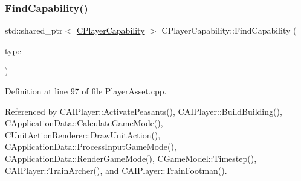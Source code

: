 \subsubsection{\texorpdfstring{Find\+Capability()}{FindCapability()}\hspace{0.1cm}{\footnotesize\ttfamily [1/2]}}
{\footnotesize\ttfamily std\+::shared\+\_\+ptr$<$ \hyperlink{classCPlayerCapability}{C\+Player\+Capability} $>$ C\+Player\+Capability\+::\+Find\+Capability (\begin{DoxyParamCaption}\item[{\hyperlink{GameDataTypes_8h_a35b98ce26aca678b03c6f9f76e4778ce}{E\+Asset\+Capability\+Type}}]{type }\end{DoxyParamCaption})\hspace{0.3cm}{\ttfamily [static]}}



Definition at line 97 of file Player\+Asset.\+cpp.



Referenced by C\+A\+I\+Player\+::\+Activate\+Peasants(), C\+A\+I\+Player\+::\+Build\+Building(), C\+Application\+Data\+::\+Calculate\+Game\+Mode(), C\+Unit\+Action\+Renderer\+::\+Draw\+Unit\+Action(), C\+Application\+Data\+::\+Process\+Input\+Game\+Mode(), C\+Application\+Data\+::\+Render\+Game\+Mode(), C\+Game\+Model\+::\+Timestep(), C\+A\+I\+Player\+::\+Train\+Archer(), and C\+A\+I\+Player\+::\+Train\+Footman().


